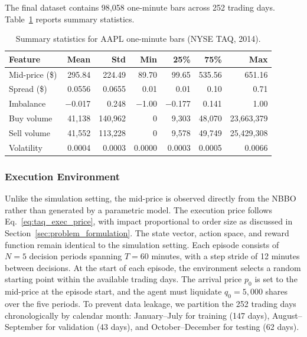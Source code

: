\documentclass[11pt]{article}
\begin{document}
The final dataset contains 98{,}058 one-minute bars across 252 trading days.  Table~\ref{tab:data_summary} reports summary statistics.

\begin{table}[H]
    \centering
    
    \begin{tabular}{@{}lrrrrrr@{}}
        \toprule
        \textbf{Feature} & \textbf{Mean} & \textbf{Std} & \textbf{Min} & \textbf{25\%} & \textbf{75\%} & \textbf{Max} \\
        \midrule
        Mid-price (\$)     & 295.84  & 224.49  & 89.70   & 99.65   & 535.56   & 651.16  \\
        Spread (\$)        & 0.0556  & 0.0655  & 0.01    & 0.01    & 0.10     & 0.71    \\
        Imbalance          & $-$0.017 & 0.248  & $-$1.00 & $-$0.177 & 0.141   & 1.00    \\
        Buy volume         & 41{,}138 & 140{,}962 & 0     & 9{,}303 & 48{,}070 & 23{,}663{,}379 \\
        Sell volume        & 41{,}552 & 113{,}228 & 0     & 9{,}578 & 49{,}749 & 25{,}429{,}308 \\
        Volatility         & 0.0004  & 0.0003  & 0.0000  & 0.0003  & 0.0005   & 0.0066  \\
        \bottomrule
    \end{tabular}
\caption{Summary statistics for AAPL one-minute bars (NYSE TAQ, 2014).}
\label{tab:data_summary}
\end{table}
\subsubsection*{Execution Environment}

Unlike the simulation setting, the mid-price is observed 
directly from the NBBO rather than generated by a parametric 
model. The execution price follows 
Eq.~\eqref{eq:taq_exec_price}, with impact proportional to 
order size as discussed in Section~\ref{sec:problem_formulation}. 
The state vector, action space, and reward function remain 
identical to the simulation setting. Each episode consists of $N = 5$ decision periods spanning 
$T = 60$ minutes, with a step stride of 12 minutes between 
decisions. At the start of each episode, the environment 
selects a random starting point within the available trading 
days. The arrival price $p_0$ is set to the mid-price at the 
episode start, and the agent must liquidate $q_0 = 5{,}000$ 
shares over the five periods. To prevent data leakage, we partition the 252 trading days 
chronologically by calendar month: January--July for training 
(147 days), August--September for validation (43 days), and 
October--December for testing (62 days).
\end{document}
